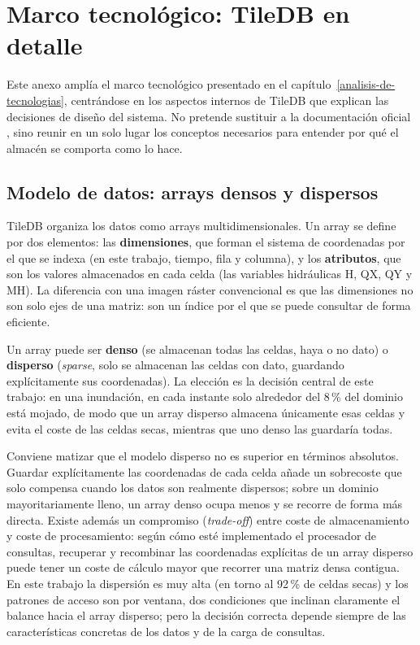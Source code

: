 \chapter{Marco tecnológico: TileDB en detalle}\label{anexo-h.-marco-tecnologico-tiledb}

Este anexo amplía el marco tecnológico presentado en el capítulo~\ref{analisis-de-tecnologias}, centrándose en los aspectos internos de TileDB que explican las decisiones de diseño del sistema. No pretende sustituir a la documentación oficial \cite{tiledb_web}, sino reunir en un solo lugar los conceptos necesarios para entender por qué el almacén se comporta como lo hace.

\section{Modelo de datos: arrays densos y dispersos}\label{h-modelo}

TileDB organiza los datos como arrays multidimensionales. Un array se define por dos elementos: las \textbf{dimensiones}, que forman el sistema de coordenadas por el que se indexa (en este trabajo, tiempo, fila y columna), y los \textbf{atributos}, que son los valores almacenados en cada celda (las variables hidráulicas H, QX, QY y MH). La diferencia con una imagen ráster convencional es que las dimensiones no son solo ejes de una matriz: son un índice por el que se puede consultar de forma eficiente.

Un array puede ser \textbf{denso} (se almacenan todas las celdas, haya o no dato) o \textbf{disperso} (\textit{sparse}, solo se almacenan las celdas con dato, guardando explícitamente sus coordenadas). La elección es la decisión central de este trabajo: en una inundación, en cada instante solo alrededor del 8\,\% del dominio está mojado, de modo que un array disperso almacena únicamente esas celdas y evita el coste de las celdas secas, mientras que uno denso las guardaría todas.

Conviene matizar que el modelo disperso no es superior en términos absolutos. Guardar explícitamente las coordenadas de cada celda añade un sobrecoste que solo compensa cuando los datos son realmente dispersos; sobre un dominio mayoritariamente lleno, un array denso ocupa menos y se recorre de forma más directa. Existe además un compromiso (\textit{trade-off}) entre coste de almacenamiento y coste de procesamiento: según cómo esté implementado el procesador de consultas, recuperar y recombinar las coordenadas explícitas de un array disperso puede tener un coste de cálculo mayor que recorrer una matriz densa contigua. En este trabajo la dispersión es muy alta (en torno al 92\,\% de celdas secas) y los patrones de acceso son por ventana, dos condiciones que inclinan claramente el balance hacia el array disperso; pero la decisión correcta depende siempre de las características concretas de los datos y de la carga de consultas.


